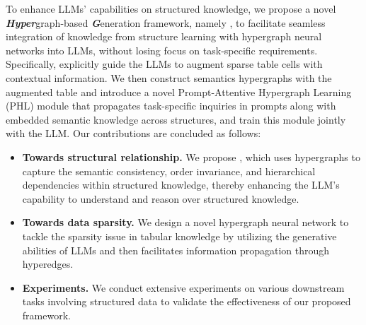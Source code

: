 To enhance LLMs' capabilities on structured knowledge, we propose a novel \textbf{\textit{Hyper}}graph-based \textbf{\textit{G}}eneration framework, namely \textbf{\name}, to facilitate seamless integration of knowledge from structure learning with hypergraph neural networks into LLMs, without losing focus on task-specific requirements. Specifically, \name explicitly guide the LLMs to augment sparse table cells with contextual information. We then construct semantics hypergraphs with the augmented table and introduce a novel Prompt-Attentive Hypergraph Learning (PHL) module that propagates task-specific inquiries in prompts along with embedded semantic knowledge across structures, and train this module jointly with the LLM. Our contributions are concluded as follows:
\begin{itemize}[leftmargin=*]
    \item \textbf{Towards structural relationship.} We propose \name, which uses hypergraphs to capture the semantic consistency, order invariance, and hierarchical dependencies within structured knowledge, thereby enhancing the LLM’s capability to understand and reason over structured knowledge.
    \item \textbf{Towards data sparsity.} We design a novel hypergraph neural network to tackle the sparsity issue in tabular knowledge by utilizing the generative abilities of LLMs and then facilitates information propagation through hyperedges.
    \item \textbf{Experiments.} We conduct extensive experiments on various downstream tasks involving structured data to validate the effectiveness of our proposed \name framework.
\end{itemize}